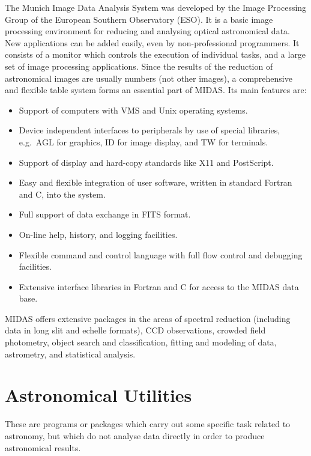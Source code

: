 \begin{description}
The Munich Image Data Analysis System was developed by the Image Processing
Group of the European Southern Observatory (ESO).
It is a basic image processing environment for reducing and analysing optical
astronomical data.
New applications can be added easily, even by non-professional programmers.
It consists of a monitor which controls the execution of individual tasks, 
and a large set of image processing applications.
Since the results of the reduction of astronomical images are usually numbers
(not other images), a comprehensive and flexible table system forms an
essential part of MIDAS.
Its main features are:
\begin{itemize}
\item Support of computers with VMS and Unix operating systems.
\item Device independent interfaces to peripherals by use of special libraries,
 e.g.\ AGL for graphics, ID for image display, and TW for terminals.
\item Support of display and hard-copy standards like X11 and PostScript.
\item Easy and flexible integration of user software, written in standard
 Fortran and C, into the system.
\item Full support of data exchange in FITS format.
\item On-line help, history, and logging facilities.
\item Flexible command and control language with full flow control and
 debugging facilities.
\item Extensive interface libraries in Fortran and C for access to the MIDAS
 data base.
\end{itemize}
MIDAS offers extensive packages in the areas of spectral reduction (including
data in long slit and echelle formats), CCD observations, crowded field
photometry, object search and classification, fitting and modeling of data,
astrometry, and statistical analysis.

\end{description}

\newpage

\section {Astronomical Utilities}

These are programs or packages which carry out some specific task related to
astronomy, but which do not analyse data directly in order to produce
astronomical results.

